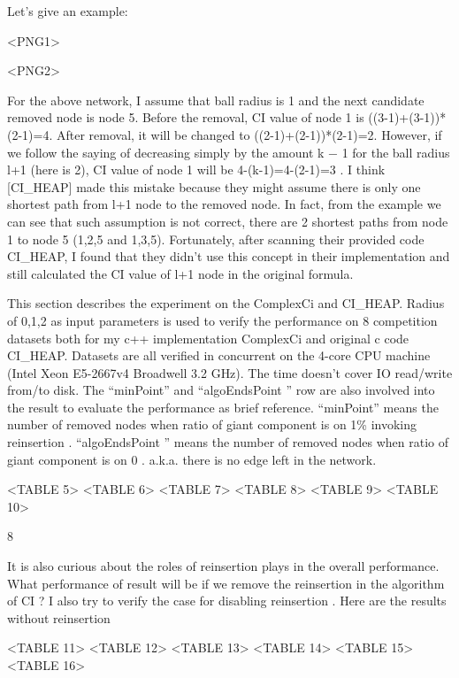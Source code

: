 \documentclass{article}
\begin{document}
	

	Let’s give an example:


	<PNG1>
	
	<PNG2>
	
	
	For the above network, I assume that ball radius is 1 and the next candidate removed node is node 5. Before the removal, CI value of node 1 is ((3-1)+(3-1))*(2-1)=4. After removal, it will be changed to ((2-1)+(2-1))*(2-1)=2. However, if we follow the saying of decreasing simply by the amount k − 1 for the ball radius l+1 (here is 2), CI value of node 1 will be 4-(k-1)=4-(2-1)=3 . I think [CI\_HEAP] made this mistake because they might assume there is only one shortest path from l+1 node to the removed node. In fact, from the example we can see that such assumption is not correct, there are 2 shortest paths from node 1 to node 5 (1,2,5 and 1,3,5). Fortunately, after scanning their provided code CI\_HEAP, I found that they didn’t use this concept in their implementation and still calculated the CI value of l+1 node in the original formula.
	
	This section describes the experiment on the ComplexCi and CI\_HEAP. Radius of 0,1,2 as input parameters is used to verify the performance on 8 competition datasets both for my c++ implementation ComplexCi and original c code CI\_HEAP. Datasets are all verified in concurrent on the 4-core CPU machine (Intel Xeon E5-2667v4 Broadwell 3.2 GHz). The time doesn't cover IO read/write from/to disk. The “minPoint” and “algoEndsPoint ” row are also involved into the result to evaluate the performance as brief reference. “minPoint” means the number of removed nodes when ratio of giant component is on 1\% invoking reinsertion . “algoEndsPoint ” means the number of removed nodes when ratio of giant component is on 0 . a.k.a. there is no edge left in the network.
	
	<TABLE 5>
	<TABLE 6>
	<TABLE 7>
	<TABLE 8>
	<TABLE 9>
	<TABLE 10>
	
	8
	
	It is also curious about the roles of reinsertion plays in the overall performance. What performance of result will be if we remove the reinsertion in the algorithm of CI ? I also try to verify the case for disabling reinsertion . Here are the results without reinsertion 
	
	<TABLE 11>
	<TABLE 12>
	<TABLE 13>
	<TABLE 14>
	<TABLE 15>
	<TABLE 16>
	
\end{document}
